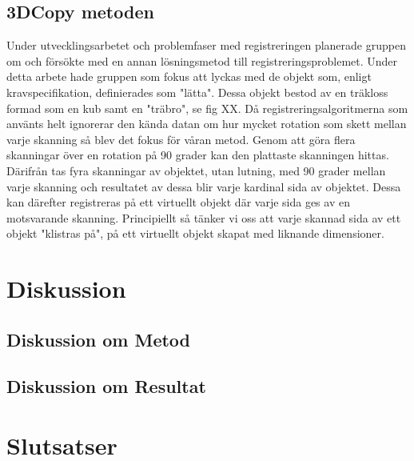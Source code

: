 \subsection{3DCopy metoden}
Under utvecklingsarbetet och problemfaser med registreringen planerade gruppen om och försökte med en annan lösningsmetod till registreringsproblemet. Under detta arbete hade gruppen som fokus att lyckas med de objekt som, enligt kravspecifikation, definierades som "lätta". Dessa objekt bestod av en träkloss formad som en kub samt en "träbro", se fig XX. Då registreringsalgoritmerna som använts helt ignorerar den kända datan om hur mycket rotation som skett mellan varje skanning så blev det fokus för våran metod. Genom att göra flera skanningar över en rotation på 90 grader kan den plattaste skanningen hittas. Därifrån tas fyra skanningar av objektet, utan lutning, med 90 grader mellan varje skanning och resultatet av dessa blir varje kardinal sida av objektet. Dessa kan därefter registreras på ett virtuellt objekt där varje sida ges av en motsvarande skanning. Principiellt så tänker vi oss att varje skannad sida av ett objekt "klistras på", på ett virtuellt objekt skapat med liknande dimensioner. 

\section{Diskussion}
\label{sec:discussion-karlsson}


\subsection{Diskussion om Metod}

\subsection{Diskussion om Resultat}



\section{Slutsatser}
\label{sec:conclusions-karlsson}


